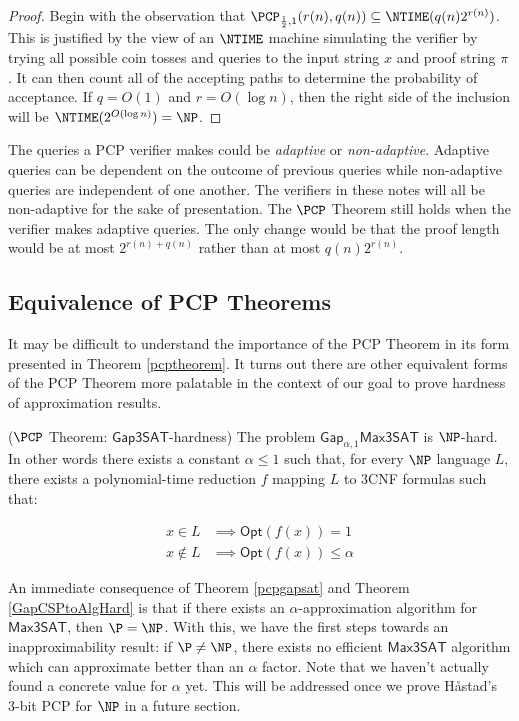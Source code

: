 \begin{proof}
Begin with the observation that $\PCP_{\frac{1}{2},1}(r(n), q(n)) \subseteq \NTIME(q(n)2^{r(n)})$. This is justified by the view of an $\NTIME$ machine simulating the verifier by trying all possible coin tosses and queries to the input string $x$ and proof string $\pi$. It can then count all of the accepting paths to determine the probability of acceptance. If $q = O(1)$ and $r = O(\log{n})$, then the right side of the inclusion will be $\NTIME(2^{O(\log{n})}) = \NP$.
\end{proof}

\begin{remark}
  The queries a PCP verifier makes could be \emph{adaptive} or \emph{non-adaptive}. Adaptive queries can be dependent on the outcome of previous queries while non-adaptive queries are independent of one another. The verifiers in these notes will all be non-adaptive for the sake of presentation. The $\PCP$ Theorem still holds when the verifier makes adaptive queries. The only change would be that the proof length would be at most $2^{r(n) + q(n)}$ rather than at most $q(n)2^{r(n)}$.
\end{remark}


%
\subsection{Equivalence of PCP Theorems}
It may be difficult to understand the importance of the PCP Theorem in its form presented in Theorem \ref{pcptheorem}. It turns out there are other equivalent forms of the PCP Theorem more palatable in the context of our goal to prove hardness of approximation results.

\begin{theorem} \label{pcpgapsat}($\PCP$ Theorem: $\mathsf{Gap3SAT}$-hardness)
The problem $\mathsf{Gap}_{\alpha,1}\mathsf{Max3SAT}$ is $\NP$-hard. In other words there exists a constant $\alpha  \leq 1$ such that, for every $\NP$ language $L$, there exists a polynomial-time reduction $f$ mapping $L$ to 3CNF formulas such that:

\begin{align*}
  x \in L & \implies \mathsf{Opt}(f(x)) = 1 \\
  x \not\in L & \implies \mathsf{Opt}(f(x)) \leq \alpha
\end{align*}
\end{theorem}

An immediate consequence of Theorem \ref{pcpgapsat} and Theorem \ref{GapCSPtoAlgHard} is that if there exists an $\alpha$-approximation algorithm for $\mathsf{Max3SAT}$, then $\P = \NP$. With this, we have the first steps towards an inapproximability result: if $\P \neq \NP$, there exists no efficient $\mathsf{Max3SAT}$ algorithm which can approximate better than an $\alpha$ factor. Note that we haven't actually found a concrete value for $\alpha$ yet. This will be addressed once we prove H\aa stad's 3-bit PCP for $\NP$ in a future section.


